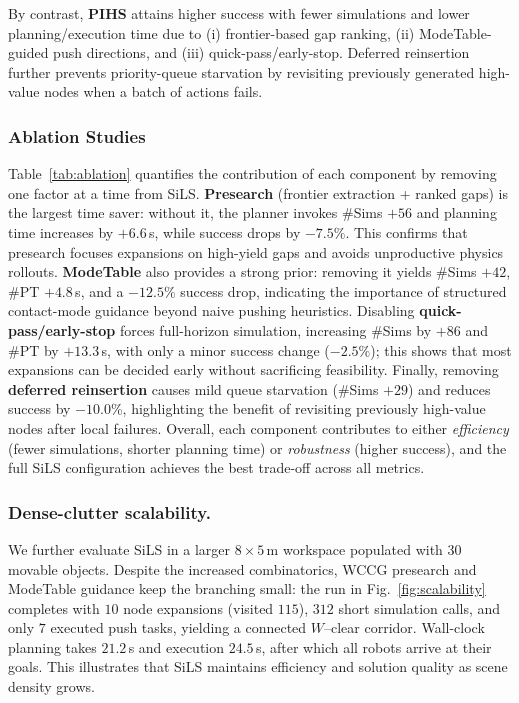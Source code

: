 By contrast, \textbf{PIHS} attains higher success with fewer simulations and lower planning/execution time due to (i) frontier-based gap ranking, (ii) ModeTable-guided push directions, and (iii) quick-pass/early-stop. Deferred reinsertion further prevents priority-queue starvation by revisiting previously generated high-value nodes when a batch of actions fails.
\subsubsection{Ablation Studies}
Table~\ref{tab:ablation} quantifies the contribution of each component by removing one factor at a time from SiLS.
\textbf{Presearch} (frontier extraction + ranked gaps) is the largest time saver: without it, the planner invokes \#Sims $+56$ and planning time increases by $+6.6$\,s, while success drops by $-7.5\%$. This confirms that presearch focuses expansions on high-yield gaps and avoids unproductive physics rollouts.
\textbf{ModeTable} also provides a strong prior: removing it yields \#Sims $+42$, \#PT $+4.8$\,s, and a $-12.5\%$ success drop, indicating the importance of structured contact-mode guidance beyond naive pushing heuristics.
Disabling \textbf{quick-pass/early-stop} forces full-horizon simulation, increasing \#Sims by $+86$ and \#PT by $+13.3$\,s, with only a minor success change ($-2.5\%$); this shows that most expansions can be decided early without sacrificing feasibility.
Finally, removing \textbf{deferred reinsertion} causes mild queue starvation (\#Sims $+29$) and reduces success by $-10.0\%$, highlighting the benefit of revisiting previously high-value nodes after local failures.
Overall, each component contributes to either \emph{efficiency} (fewer simulations, shorter planning time) or \emph{robustness} (higher success), and the full SiLS configuration achieves the best trade-off across all metrics.

\subsubsection{Dense-clutter scalability.}
We further evaluate SiLS in a larger $8{\times}5$\,m workspace populated with $30$ movable objects.
Despite the increased combinatorics, WCCG presearch and ModeTable guidance keep the branching small:
the run in Fig.~\ref{fig:scalability} completes with $10$ node expansions (visited $115$), $312$ short simulation calls,
and only $7$ executed push tasks, yielding a connected $W$–clear corridor.
Wall-clock planning takes $21.2$\,s and execution $24.5$\,s, after which all robots arrive at their goals.
This illustrates that SiLS maintains efficiency and solution quality as scene density grows.
